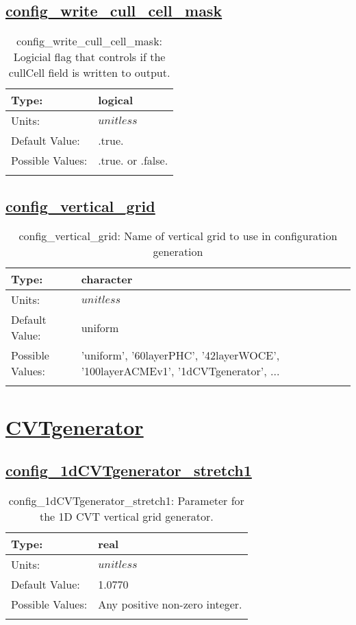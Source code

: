 \subsection[config\_write\_cull\_cell\_mask]{\hyperref[sec:nm_tab_init_setup]{config\_write\_cull\_cell\_mask}}
\label{subsec:nm_sec_config_write_cull_cell_mask}
\begin{center}
\begin{longtable}{| p{2.0in} || p{4.0in} |}
    \hline
    Type: & logical \\
    \hline
    Units: & $unitless$ \\
    \hline
    Default Value: & .true. \\
    \hline
    Possible Values: & .true. or .false. \\
    \hline
    \caption{config\_write\_cull\_cell\_mask: Logicial flag that controls if the cullCell field is written to output.}
\end{longtable}
\end{center}
\subsection[config\_vertical\_grid]{\hyperref[sec:nm_tab_init_setup]{config\_vertical\_grid}}
\label{subsec:nm_sec_config_vertical_grid}
\begin{center}
\begin{longtable}{| p{2.0in} || p{4.0in} |}
    \hline
    Type: & character \\
    \hline
    Units: & $unitless$ \\
    \hline
    Default Value: & uniform \\
    \hline
    Possible Values: & 'uniform', '60layerPHC', '42layerWOCE', '100layerACMEv1', '1dCVTgenerator', ... \\
    \hline
    \caption{config\_vertical\_grid: Name of vertical grid to use in configuration generation}
\end{longtable}
\end{center}
\section[CVTgenerator]{\hyperref[sec:nm_tab_CVTgenerator]{CVTgenerator}}
\label{sec:nm_sec_CVTgenerator}
\subsection[config\_1dCVTgenerator\_stretch1]{\hyperref[sec:nm_tab_CVTgenerator]{config\_1dCVTgenerator\_stretch1}}
\label{subsec:nm_sec_config_1dCVTgenerator_stretch1}
\begin{center}
\begin{longtable}{| p{2.0in} || p{4.0in} |}
    \hline
    Type: & real \\
    \hline
    Units: & $unitless$ \\
    \hline
    Default Value: & 1.0770 \\
    \hline
    Possible Values: & Any positive non-zero integer. \\
    \hline
    \caption{config\_1dCVTgenerator\_stretch1: Parameter for the 1D CVT vertical grid generator.}
\end{longtable}
\end{center}
